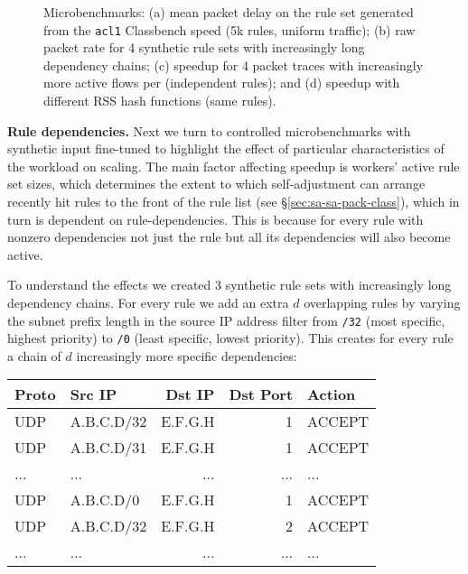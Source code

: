 \begin{figure*}[t]
  \centering
  \hspace{-1.4em}
  \hspace{-1.4em}
  \hspace{-1.4em}
  \caption{Microbenchmarks: (a) mean packet delay on the rule set generated from the \texttt{acl1} Classbench speed (5k rules, uniform traffic); (b) raw packet rate for 4 synthetic rule sets with increasingly long dependency chains; (c) speedup for 4 packet traces with increasingly more active flows per (independent rules); and (d) speedup with different RSS hash functions (same rules).}
  \label{fig:microbenchmark}
\end{figure*}

\noindent%
\textbf{Rule dependencies.} %
Next we turn to controlled microbenchmarks with synthetic input fine-tuned to highlight the effect of particular characteristics of the workload on scaling. The main factor affecting speedup is workers' active rule set sizes, which determines the extent to which self-adjustment can arrange recently hit rules to the front of the rule list (see \S\ref{sec:sa-sa-pack-class}), which in turn is dependent on rule-dependencies. This is because for every rule with nonzero dependencies not just the rule but all its dependencies will also become active.

To understand the effects we created 3 synthetic rule sets with increasingly long dependency chains. For every rule we add an extra $d$ overlapping rules by varying the subnet prefix length in the source IP address filter from \texttt{/32} (most specific, highest priority) to \texttt{/0} (least specific, lowest priority). This creates for every rule a chain of $d$ increasingly more specific dependencies:
\begin{small}
  \begin{tabular}{l|l|r|r|l}
    \textbf{Proto} & \textbf{Src IP} & \textbf{Dst IP} & \textbf{Dst Port} & \textbf{Action}\\
    \hline
    UDP & A.B.C.D/32   & E.F.G.H  & 1  & ACCEPT\\
    UDP & A.B.C.D/31   & E.F.G.H  & 1  & ACCEPT\\
    ... & ...   & ...  & ...  & ...\\
    UDP & A.B.C.D/0   & E.F.G.H  & 1  & ACCEPT\\
    UDP & A.B.C.D/32  & E.F.G.H  & 2  & ACCEPT\\
    ... & ...   & ...  & ...  & ...\\
  \end{tabular}
\end{small}

